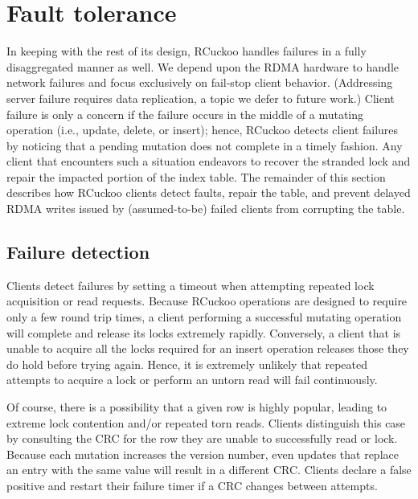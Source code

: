 \section{Fault tolerance}
\label{sec:fault-tolerance}

In keeping with the rest of its design, RCuckoo handles failures in a
fully disaggregated manner as well.  We depend upon the RDMA hardware
to handle network failures and focus exclusively on fail-stop client
behavior.  (Addressing server failure requires data replication, a
topic we defer to future work.)  Client failure is only a concern if
the failure occurs in the middle of a mutating operation (i.e.,
update, delete, or insert); hence, RCuckoo detects client failures by
noticing that a pending mutation does not complete in a timely
fashion.  Any client that encounters such a situation endeavors to
recover the stranded lock and repair the impacted portion of the index
table.
%
%
The remainder of this section describes how RCuckoo
clients detect faults, repair the table, and prevent delayed
RDMA writes issued by (assumed-to-be) failed clients from corrupting the table.

\subsection{Failure detection} 

Clients detect failures by setting a timeout when attempting repeated
lock acquisition or read requests.  Because RCuckoo operations are
designed to require only a few round trip times, a client performing a
successful mutating operation will complete and release its locks
extremely rapidly.  Conversely, a client that is unable to acquire all
the locks required for an insert operation releases those they do hold
before trying again.  Hence, it is extremely unlikely that repeated
attempts to acquire a lock or perform an untorn read will fail
continuously.

Of course, there is a possibility that a given row is highly popular,
leading to extreme lock contention and/or repeated torn reads.
Clients distinguish this case by consulting the CRC for the row they
are unable to successfully read or lock.  Because each mutation
increases the version number, even updates that replace an entry with
the same value will result in a different CRC.  Clients declare a
false positive and restart their failure timer if a CRC changes
between attempts.

